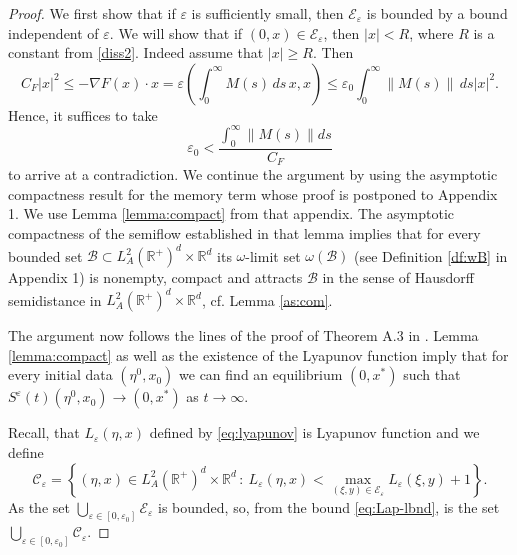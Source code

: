 \documentclass[11pt, leqno]{amsart}
\theoremstyle{definition}
\def\R{\mathbb{R}}
\begin{document}
\begin{proof}
	We first show that if $\varepsilon$ is sufficiently small, then $\mathcal{E}_\varepsilon$ is bounded by a bound independent of $\varepsilon$. 
	We will show that if $(0,x)\in \mathcal{E}_\varepsilon$, then $|x|< R$, where $R$ is a constant from \eqref{diss2}. Indeed assume that $|x|\geq R$. Then
	$$
	C_F|x|^2 \leq -\nabla F(x)\cdot x = \varepsilon \left(\int_0^\infty M(s)\, ds\, x,x\right) \leq \varepsilon_0 \int_0^\infty \|M(s)\|\, ds |x|^2.    
	$$ 
	Hence, it suffices to take 
	$$\varepsilon_0 < \frac{\int_0^\infty\|M(s)\|ds}{C_F}$$ to arrive at a contradiction.  
We continue the argument by using the asymptotic compactness
result for the memory term whose proof is postponed to Appendix 1. We  use Lemma \ref{lemma:compact} from that appendix. The asymptotic compactness of the semiflow established in that lemma implies  that for every bounded set $\mathcal{B}\subset  L^2_A(\R^+)^d\times \R^d$ its $\omega$-limit set $\omega(\mathcal{B})$ (see Definition \ref{df:wB} in Appendix 1) is nonempty, compact and attracts $\mathcal{B}$ in the sense of Hausdorff semidistance in $ L^2_A(\R^+)^d\times \R^d$, cf. Lemma \ref{as:com}.

The argument now follows the lines of the proof of Theorem A.3 in \cite{Pata}.
Lemma \ref{lemma:compact}
as well as the existence of the Lyapunov function imply that for every initial data $(\eta^0,x_0)$ we can find an equilibrium $(0,x^*)$ such that
$S^\varepsilon(t)(\eta^0,x_0)\to (0,x^*)$ as $t\to \infty$.

Recall, that $L_\varepsilon(\eta,x)$  defined by \eqref{eq:lyapunov}  is Lyapunov function and we define   
$$
\mathcal{C}_\varepsilon = \left\{(\eta,x)\in L^2_A( \R^+)^d \times \R^d \,:\ L_\varepsilon(\eta,x) < \max_{(\xi,y)\in \mathcal{E}_\varepsilon} L_{\varepsilon}(\xi,y) + 1\right\}.
$$
As the set $\bigcup_{\varepsilon\in [0,\varepsilon_0]}\mathcal{E}_\varepsilon$ is bounded, so, from the bound \eqref{eq:Lap-lbnd}, is the set $\bigcup_{\varepsilon\in [0,\varepsilon_0]}\mathcal{C}_\varepsilon$.


\end{proof}
\end{document}
